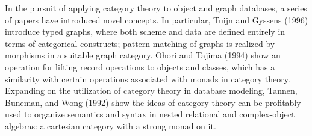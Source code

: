  

In the pursuit of applying category theory to object and graph databases, a series of papers have  introduced novel concepts. In particular, Tuijn and Gyssens (1996) \cite{journals/tcs/TuijnG96} introduce typed graphs, where both scheme and
data are defined entirely in terms of categorical constructs; pattern matching of graphs
is realized by morphisms in a suitable graph category.  Ohori and Tajima  (1994) \cite{conf/pods/OhoriT94} show an operation for lifting record operations to objects and classes, which has a similarity with
certain operations associated with monads in category theory. Expanding on the utilization of category theory in database modeling, Tannen, Buneman, and Wong (1992) \cite{conf/icdt/TannenBW92} show the ideas of category theory can be profitably used to organize semantics and syntax in nested relational and complex-object algebras: a cartesian category with a strong monad on it. 




